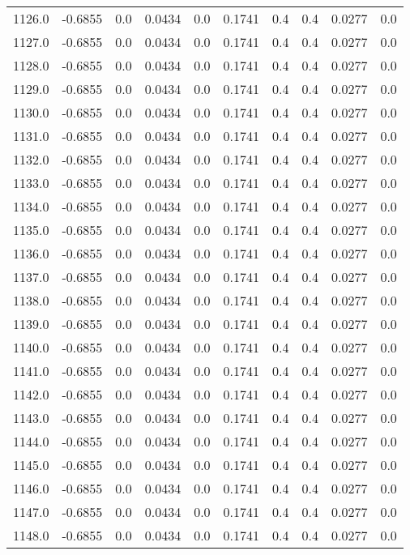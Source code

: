 \begin{longtable}{lrrrrrrrrr}
1126.0 & -0.6855 & 0.0 & 0.0434 & 0.0 & 0.1741 & 0.4 & 0.4 & 0.0277 & 0.0 \\
1127.0 & -0.6855 & 0.0 & 0.0434 & 0.0 & 0.1741 & 0.4 & 0.4 & 0.0277 & 0.0 \\
1128.0 & -0.6855 & 0.0 & 0.0434 & 0.0 & 0.1741 & 0.4 & 0.4 & 0.0277 & 0.0 \\
1129.0 & -0.6855 & 0.0 & 0.0434 & 0.0 & 0.1741 & 0.4 & 0.4 & 0.0277 & 0.0 \\
1130.0 & -0.6855 & 0.0 & 0.0434 & 0.0 & 0.1741 & 0.4 & 0.4 & 0.0277 & 0.0 \\
1131.0 & -0.6855 & 0.0 & 0.0434 & 0.0 & 0.1741 & 0.4 & 0.4 & 0.0277 & 0.0 \\
1132.0 & -0.6855 & 0.0 & 0.0434 & 0.0 & 0.1741 & 0.4 & 0.4 & 0.0277 & 0.0 \\
1133.0 & -0.6855 & 0.0 & 0.0434 & 0.0 & 0.1741 & 0.4 & 0.4 & 0.0277 & 0.0 \\
1134.0 & -0.6855 & 0.0 & 0.0434 & 0.0 & 0.1741 & 0.4 & 0.4 & 0.0277 & 0.0 \\
1135.0 & -0.6855 & 0.0 & 0.0434 & 0.0 & 0.1741 & 0.4 & 0.4 & 0.0277 & 0.0 \\
1136.0 & -0.6855 & 0.0 & 0.0434 & 0.0 & 0.1741 & 0.4 & 0.4 & 0.0277 & 0.0 \\
1137.0 & -0.6855 & 0.0 & 0.0434 & 0.0 & 0.1741 & 0.4 & 0.4 & 0.0277 & 0.0 \\
1138.0 & -0.6855 & 0.0 & 0.0434 & 0.0 & 0.1741 & 0.4 & 0.4 & 0.0277 & 0.0 \\
1139.0 & -0.6855 & 0.0 & 0.0434 & 0.0 & 0.1741 & 0.4 & 0.4 & 0.0277 & 0.0 \\
1140.0 & -0.6855 & 0.0 & 0.0434 & 0.0 & 0.1741 & 0.4 & 0.4 & 0.0277 & 0.0 \\
1141.0 & -0.6855 & 0.0 & 0.0434 & 0.0 & 0.1741 & 0.4 & 0.4 & 0.0277 & 0.0 \\
1142.0 & -0.6855 & 0.0 & 0.0434 & 0.0 & 0.1741 & 0.4 & 0.4 & 0.0277 & 0.0 \\
1143.0 & -0.6855 & 0.0 & 0.0434 & 0.0 & 0.1741 & 0.4 & 0.4 & 0.0277 & 0.0 \\
1144.0 & -0.6855 & 0.0 & 0.0434 & 0.0 & 0.1741 & 0.4 & 0.4 & 0.0277 & 0.0 \\
1145.0 & -0.6855 & 0.0 & 0.0434 & 0.0 & 0.1741 & 0.4 & 0.4 & 0.0277 & 0.0 \\
1146.0 & -0.6855 & 0.0 & 0.0434 & 0.0 & 0.1741 & 0.4 & 0.4 & 0.0277 & 0.0 \\
1147.0 & -0.6855 & 0.0 & 0.0434 & 0.0 & 0.1741 & 0.4 & 0.4 & 0.0277 & 0.0 \\
1148.0 & -0.6855 & 0.0 & 0.0434 & 0.0 & 0.1741 & 0.4 & 0.4 & 0.0277 & 0.0 \\

\end{longtable}
